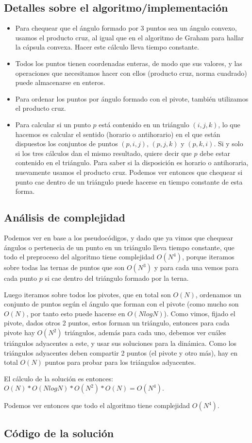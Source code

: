\subsection{Detalles sobre el algoritmo/implementación}
\begin{itemize}
\item Para chequear que el ángulo formado por 3 puntos sea un ángulo convexo, usamos 
el producto cruz, al igual que en el algoritmo de Graham para hallar la cápsula convexa. 
Hacer este cálculo lleva tiempo constante. 
\item Todos los puntos tienen coordenadas enteras, de modo que sus valores, y 
las operaciones que necesitamos hacer con ellos (producto cruz, norma cuadrado) puede almacenarse 
en enteros. 
\item Para ordenar los puntos por ángulo formado con el pivote, también utilizamos el producto 
cruz. 
\item Para calcular si un punto $p$ está contenido en un triángulo $(i,j,k)$, lo que hacemos 
es calcular el sentido (horario o antihorario) en el que están dispuestos los conjuntos de puntos 
$(p,i,j)$, $(p,j,k)$ y $(p,k,i)$. Si y solo si los tres cálculos dan el mismo resultado, quiere 
decir que $p$ debe estar contenido en el triángulo. Para saber si la disposición es horario o antihoraria, 
nuevamente usamos el producto cruz. Podemos ver entonces que chequear si punto cae dentro de un triángulo 
puede hacerse en tiempo constante de esta forma. 
\end{itemize}

\subsection{Análisis de complejidad}
Podemos ver en base a los pseudocódigos, y dado que ya vimos que chequear ángulos 
o pertenecia de un punto en un triángulo lleva tiempo constante, que todo el preproceso 
del algoritmo tiene complejidad $O(N^4)$, porque iteramos sobre todas las ternas de puntos que son 
$O(N^3)$ y para cada una vemos para cada punto $p$ si cae dentro del triángulo formado por la terna. 

Luego iteramos sobre todos los pivotes, que en total son $O(N)$, ordenamos un conjunto de puntos 
según el ángulo que forman con el pivote (como mucho son $O(N)$, por tanto esto puede hacerse 
en $O(N log N)$). Como vimos, fijado el pivote, dados otros 2 puntos, estos forman un triángulo, 
entonces para cada pivote hay $O(N^2)$ triángulos, además para cada uno, debemos ver cuáles triángulos 
adyacentes a este, y usar sus soluciones para la dinámica. Como los triángulos adyacentes deben compartir 
2 puntos (el pivote y otro más), hay en total $O(N)$ puntos para probar para los triángulos adyacentes. 

El cálculo de la solución es entonces: $O(N) * O(N log N) * O(N^2) * O(N) = O(N^4)$. 

Podemos ver entonces que todo el algoritmo tiene complejidad $O(N^4)$. 

\newpage
\subsection{Código de la solución}

